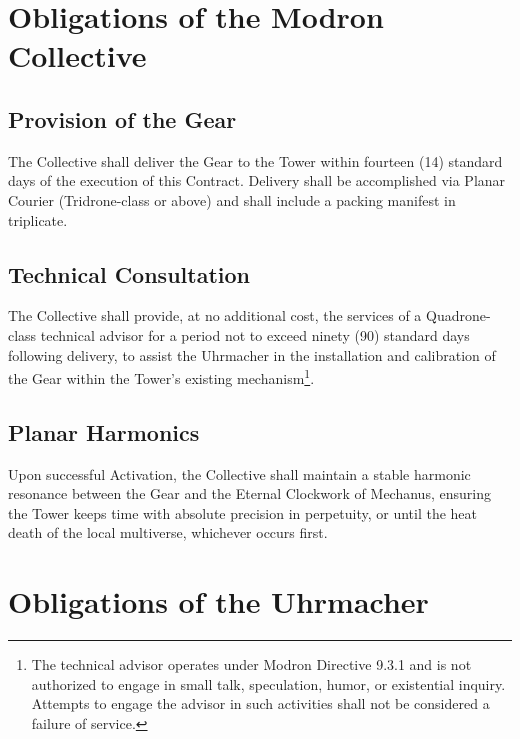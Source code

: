 \documentclass[12pt]{article}
\begin{document}

\section{Obligations of the Modron Collective}

\subsection{Provision of the Gear}
The Collective shall deliver the Gear to the Tower within fourteen
(14) standard days of the execution of this Contract. Delivery shall
be accomplished via Planar Courier (Tridrone-class or above) and shall
include a packing manifest in triplicate.

\subsection{Technical Consultation}
The Collective shall provide, at no additional cost, the services of a
Quadrone-class technical advisor for a period not to exceed ninety (90)
standard days following delivery, to assist the Uhrmacher in the
installation and calibration of the Gear within the Tower's existing
mechanism\footnote{The technical advisor operates under Modron
Directive 9.3.1 and is not authorized to engage in small talk,
speculation, humor, or existential inquiry. Attempts to engage the
advisor in such activities shall not be considered a failure of
service.}.

\subsection{Planar Harmonics}
Upon successful Activation, the Collective shall maintain a stable
harmonic resonance between the Gear and the Eternal Clockwork of
Mechanus, ensuring the Tower keeps time with absolute precision in
perpetuity, or until the heat death of the local multiverse, whichever
occurs first.


\section{Obligations of the Uhrmacher}
\end{document}
